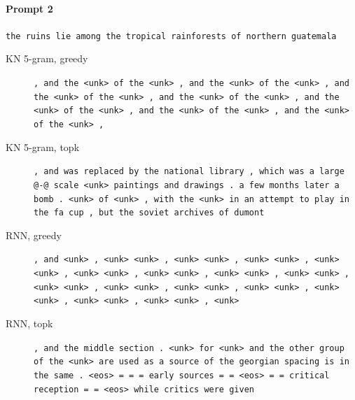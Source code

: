 \paragraph{Prompt 2} \texttt{the ruins lie among the tropical rainforests of northern guatemala}
\begin{description}
\item[KN 5-gram, greedy] \texttt{\small , and the \textless{}unk\textgreater{} of the \textless{}unk\textgreater{} , and the \textless{}unk\textgreater{} of the \textless{}unk\textgreater{} , and the \textless{}unk\textgreater{} of the \textless{}unk\textgreater{} , and the \textless{}unk\textgreater{} of the \textless{}unk\textgreater{} , and the \textless{}unk\textgreater{} of the \textless{}unk\textgreater{} , and the \textless{}unk\textgreater{} of the \textless{}unk\textgreater{} , and the \textless{}unk\textgreater{} of the \textless{}unk\textgreater{} ,}
\item[KN 5-gram, topk] \texttt{\small , and was replaced by the national library , which was a large @-@ scale \textless{}unk\textgreater{} paintings and drawings . a few months later a bomb . \textless{}unk\textgreater{} of \textless{}unk\textgreater{} , with the \textless{}unk\textgreater{} in an attempt to play in the fa cup , but the soviet archives of dumont}
\item[RNN, greedy] \texttt{\small , and \textless{}unk\textgreater{} , \textless{}unk\textgreater{} \textless{}unk\textgreater{} , \textless{}unk\textgreater{} \textless{}unk\textgreater{} , \textless{}unk\textgreater{} \textless{}unk\textgreater{} , \textless{}unk\textgreater{} \textless{}unk\textgreater{} , \textless{}unk\textgreater{} \textless{}unk\textgreater{} , \textless{}unk\textgreater{} \textless{}unk\textgreater{} , \textless{}unk\textgreater{} \textless{}unk\textgreater{} , \textless{}unk\textgreater{} \textless{}unk\textgreater{} , \textless{}unk\textgreater{} \textless{}unk\textgreater{} , \textless{}unk\textgreater{} \textless{}unk\textgreater{} , \textless{}unk\textgreater{} \textless{}unk\textgreater{} , \textless{}unk\textgreater{} \textless{}unk\textgreater{} , \textless{}unk\textgreater{} \textless{}unk\textgreater{} , \textless{}unk\textgreater{} \textless{}unk\textgreater{} , \textless{}unk\textgreater{} \textless{}unk\textgreater{} , \textless{}unk\textgreater{}}
\item[RNN, topk] \texttt{\small , and the middle section . \textless{}unk\textgreater{} for \textless{}unk\textgreater{} and the other group of the \textless{}unk\textgreater{} are used as a source of the georgian spacing is in the same . \textless{}eos\textgreater{} = = = early sources = = \textless{}eos\textgreater{} = = critical reception = = \textless{}eos\textgreater{} while critics were given}

\end{description}
